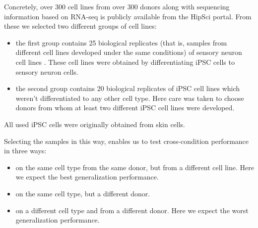 Concretely, over 300 cell lines from over 300 donors along with sequencing information based on RNA-seq is publicly available from the HipSci portal. From these we selected two different groups of cell lines:
\begin{itemize}

	\item the first group contains 25 biological replicates (that is, samples from different cell lines developed under the same conditions) of sensory neuron cell lines \cite{ipscneurons}. These cell lines were obtained by differentiating iPSC cells to sensory neuron cells.
	\item the second group contains 20 biological replicates of iPSC cell lines which weren't differentiated to any other cell type. Here care was taken to choose donors from whom at least two different iPSC cell lines were developed.
	
\end{itemize}

All used iPSC cells were originally obtained from skin cells. 

Selecting the samples in this way, enables us to test cross-condition performance in three ways:
\begin{itemize}
	\item on the same cell type from the same donor, but from a different cell line. Here we expect the best generalization performance.
	\item on the same cell type, but a different donor.
	\item on a different cell type and from a different donor. Here we expect the worst generalization performance.
\end{itemize}



